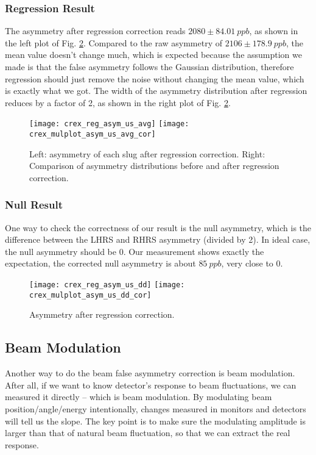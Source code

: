 \subsubsection{Regression Result}
The asymmetry after regression correction reads $2080 \pm 84.01\ ppb$, as shown 
in the left plot of Fig. \ref{fig:reg_asym_us_avg}. Compared to the raw asymmetry
of $2106 \pm 178.9\ ppb$,
the mean value doesn't change much, which is expected because the assumption 
we made is that the false asymmetry follows the Gaussian distribution, therefore
regression should just remove the noise without changing the mean value, which
is exactly what we got. The width of the asymmetry distribution after regression
reduces by a factor of 2, as shown in the right plot of Fig. \ref{fig:reg_asym_us_avg}.

\begin{figure}[H]
    \centering
    \texttt{[image: crex\_reg\_asym\_us\_avg]}
    \texttt{[image: crex\_mulplot\_asym\_us\_avg\_cor]}
    \caption{Left: asymmetry of each slug after regression correction.
    Right: Comparison of asymmetry distributions before and after regression correction.}
    \label{fig:reg_asym_us_avg}
\end{figure}

\subsubsection{Null Result}
One way to check the correctness of our result is the null asymmetry, which
is the difference between the LHRS and RHRS asymmetry (divided by 2). 
In ideal case, the null asymmetry should be 0. Our measurement shows exactly
the expectation, the corrected null asymmetry is about $85\ ppb$, very close
to 0.
\begin{figure}[H]
    \centering
    \texttt{[image: crex\_reg\_asym\_us\_dd]}
    \texttt{[image: crex\_mulplot\_asym\_us\_dd\_cor]}
    \caption{Asymmetry after regression correction.}
    \label{fig:reg_asym_us_avg}
\end{figure}

\subsection{Beam Modulation}
Another way to do the beam false asymmetry correction is beam modulation. After
all, if we want to know detector's response to beam fluctuations, we can measured
it directly -- which is beam modulation. By modulating beam position/angle/energy
intentionally, changes measured in monitors and detectors will tell us the slope.
The key point is to make sure the modulating amplitude is larger than that of 
natural beam fluctuation, so that we can extract the real response.

